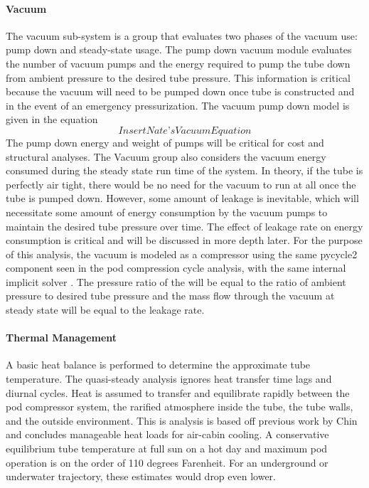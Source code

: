 \paragraph{Vacuum}
	The vacuum sub-system is a group that evaluates two phases of the vacuum use: pump down and steady-state usage. The pump down vacuum module evaluates the number of vacuum pumps and the energy required to pump the tube down from ambient pressure to the desired tube pressure. This information is critical because the vacuum will need to be pumped down once tube is constructed and in the event of an emergency pressurization. The vacuum pump down model is given in the equation
	\begin{equation}
		\label{eq:vacuum}
		Insert Nate’s Vacuum Equation
	\end{equation}
	The pump down energy and weight of pumps will be critical for cost and structural analyses.
	The Vacuum group also considers the vacuum energy consumed during the steady state run time of the system. In theory, if the tube is perfectly air tight, there would be no need for the vacuum to run at all once the tube is pumped down. However, some amount of leakage is inevitable, which will necessitate some amount of energy consumption by the vacuum pumps to maintain the desired tube pressure over time. The effect of leakage rate on energy consumption is critical and will be discussed in more depth later. For the purpose of this analysis, the vacuum is modeled as a compressor using the same pycycle2 component seen in the pod compression cycle analysis, with the same internal implicit solver \cite{pycycle2}. The pressure ratio of the will be equal to the ratio of ambient pressure to desired tube pressure and the mass flow through the vacuum at steady state will be equal to the leakage rate.
\paragraph{Thermal Management}
	A basic heat balance is performed to determine the approximate tube temperature. The quasi-steady analysis ignores heat transfer time lags and diurnal cycles. Heat is assumed to transfer and equilibrate rapidly between the pod compressor system, the rarified atmosphere inside the tube, the tube walls, and the outside environment. This is analysis is based off previous work by Chin\cite{Chin} and concludes
	manageable heat loads for air-cabin cooling. A conservative equilibrium tube temperature at full sun on a hot day and maximum pod operation is on the order of 110 degrees Farenheit.
	For an underground or underwater trajectory, these estimates would drop even lower.
